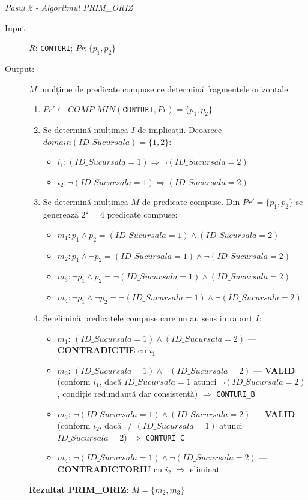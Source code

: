 \documentclass[12pt,a4paper]{article}
\begin{document}
\textit{Pasul 2 - Algoritmul PRIM\_ORIZ}

\begin{description}
  \item[Input:] $R$: \texttt{CONTURI}; \quad $Pr: \{p_1, p_2\}$
  \item[Output:] $M$: mulțime de predicate compuse ce determină fragmentele orizontale
    \begin{enumerate}
      \item $Pr' \leftarrow COMP\_MIN(\texttt{CONTURI}, Pr) = \{p_1, p_2\}$
      \item Se determină mulțimea $I$ de implicații. Deoarece $domain(ID\_Sucursala) = \{1, 2\}$:
        \begin{itemize}
          \item $i_1: (ID\_Sucursala=1) \Rightarrow \neg(ID\_Sucursala=2)$
          \item $i_2: \neg(ID\_Sucursala=1) \Rightarrow (ID\_Sucursala=2)$
        \end{itemize}
      \item Se determină mulțimea $M$ de predicate compuse. Din $Pr' = \{p_1, p_2\}$ se generează $2^2 = 4$ predicate compuse:
        \begin{itemize}
          \item $m_1: p_1 \land p_2 = (ID\_Sucursala=1) \land (ID\_Sucursala=2)$
          \item $m_2: p_1 \land \neg p_2 = (ID\_Sucursala=1) \land \neg(ID\_Sucursala=2)$
          \item $m_3: \neg p_1 \land p_2 = \neg(ID\_Sucursala=1) \land (ID\_Sucursala=2)$
          \item $m_4: \neg p_1 \land \neg p_2 = \neg(ID\_Sucursala=1) \land \neg(ID\_Sucursala=2)$
        \end{itemize}
      \item Se elimină predicatele compuse care nu au sens in raport $I$:
        \begin{itemize}
          \item $m_1$: $(ID\_Sucursala=1) \land (ID\_Sucursala=2)$ — \textbf{CONTRADICTIE} cu $i_1$
          \item $m_2$: $(ID\_Sucursala=1) \land \neg(ID\_Sucursala=2)$ — \textbf{VALID} (conform $i_1$, dacă $ID\_Sucursala=1$ atunci $\neg(ID\_Sucursala=2)$, condiție redundantă dar consistentă) $\Rightarrow$ \texttt{CONTURI\_B}
          \item $m_3$: $\neg(ID\_Sucursala=1) \land (ID\_Sucursala=2)$ — \textbf{VALID} (conform $i_2$, dacă $\neq(ID\_Sucursala=1)$ atunci $ID\_Sucursala=2$) $\Rightarrow$ \texttt{CONTURI\_C}
          \item $m_4$: $\neg(ID\_Sucursala=1) \land \neg(ID\_Sucursala=2)$ — \textbf{CONTRADICTORIU} cu $i_2$ $\Rightarrow$ eliminat
        \end{itemize}
    \end{enumerate}
    \textbf{Rezultat PRIM\_ORIZ}: $M = \{m_2, m_3\}$
\end{description}
\end{document}
